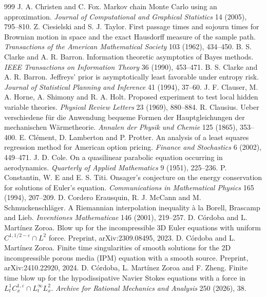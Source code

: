 \begin{thebibliography}{999}
 J. A. Christen and C. Fox. Markov chain Monte Carlo using an approximation. \emph{Journal of Computational and Graphical Statistics} 14 (2005), 795--810.
 Z. Ciesielski and S. J. Taylor. First passage times and sojourn times for Brownian motion in space and the exact Hausdorff measure of the sample path. \emph{Transactions of the American Mathematical Society} 103 (1962), 434--450.
 B. S. Clarke and A. R. Barron. Information theoretic asymptotics of Bayes methods. \emph{IEEE Transactions on Information Theory} 36 (1990), 453--471.
 B. S. Clarke and A. R. Barron. Jeffreys' prior is asymptotically least favorable under entropy risk. \emph{Journal of Statistical Planning and Inference} 41 (1994), 37--60.
 J. F. Clauser, M. A. Horne, A. Shimony and R. A. Holt. Proposed experiment to test local hidden variable theories. \emph{Physical Review Letters} 23 (1969), 880--884.
 R. Clausius. Ueber verschiedene f\"ur die Anwendung bequeme Formen der Hauptgleichungen der mechanischen W\"armetheorie. \emph{Annalen der Physik und Chemie} 125 (1865), 353--400.
 E. Cl\'ement, D. Lamberton and P. Protter. An analysis of a least squares regression method for American option pricing. \emph{Finance and Stochastics} 6 (2002), 449--471.
 J. D. Cole. On a quasilinear parabolic equation occurring in aerodynamics. \emph{Quarterly of Applied Mathematics} 9 (1951), 225--236.
 P. Constantin, W. E and E. S. Titi. Onsager's conjecture on the energy conservation for solutions of Euler's equation. \emph{Communications in Mathematical Physics} 165 (1994), 207--209.
 D. Cordero Erausquin, R. J. McCann and M. Schmuckenschl\"ager. A Riemannian interpolation inequality \`a la Borell, Brascamp and Lieb. \emph{Inventiones Mathematicae} 146 (2001), 219--257.
 D. C\'ordoba and L. Mart\'inez Zoroa. Blow up for the incompressible 3D Euler equations with uniform $C^{1,1/2-\varepsilon}\cap L^2$ force. Preprint, arXiv:2309.08495, 2023.
 D. C\'ordoba and L. Mart\'inez Zoroa. Finite time singularities of smooth solutions for the 2D incompressible porous media (IPM) equation with a smooth source. Preprint, arXiv:2410.22920, 2024.
 D. C\'ordoba, L. Mart\'inez Zoroa and F. Zheng. Finite time blow up for the hypodissipative Navier Stokes equations with a force in $L^1_tC^{1,\varepsilon}_x\cap L^\infty_tL^2_x$. \emph{Archive for Rational Mechanics and Analysis} 250 (2026), 38.

\end{thebibliography}
